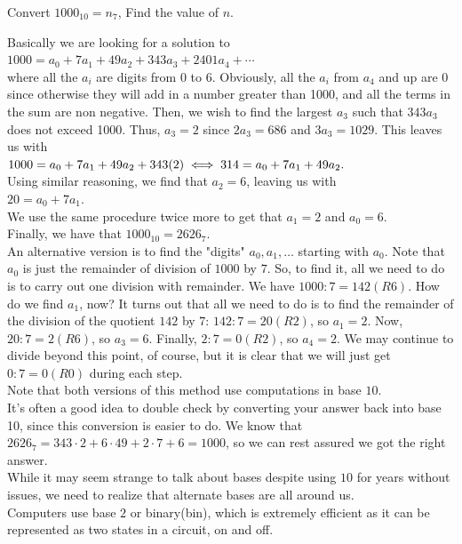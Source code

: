 \begin{example}
    Convert $1000_10=n_7$, Find the value of $n$. 
\end{example}
Basically we are looking for a solution to \\
$1000 = a_0 + 7a_1 + 49a_2 + 343a_3+2401a_4+\cdots$\\
where all the $a_i$ are digits from 0 to 6. Obviously, all the $a_i$ from $a_4$ and up are 0 since otherwise they will add in a number greater than 1000, and all the terms in the sum are non negative. Then, we wish to find the largest $a_3$ such that $343a_3$ does not exceed 1000. Thus, $a_3= 2$ since $2a_3=686$ and $3a_3=1029$. This leaves us with\\
$1000 = a_0 + 7a_1 + 49 a_2 + 343(2)\\
\iff 314 = a_0 + 7a_1 + 49 a_2.$\\
Using similar reasoning, we find that $a_2 = 6$, leaving us with\\
$20 = a_0 + 7a_1.$\\
We use the same procedure twice more to get that $a_1=2$ and $a_0=6$.\\
Finally, we have that $1000_{10}=2626_7$.\\
An alternative version is to find the "digits" $a_0,a_1,\dots$ starting with $a_0$. Note that $a_0$ is just the remainder of division of $1000$ by $7$. So, to find it, all we need to do is to carry out one division with remainder. We have $1000:7=142(R6)$. How do we find $a_1$, now? It turns out that all we need to do is to find the remainder of the division of the quotient $142$ by $7$: $142:7=20(R2)$, so $a_1=2$. Now, $20:7=2(R6)$, so $a_3=6$. Finally, $2:7=0(R2)$, so $a_4=2$. We may continue to divide beyond this point, of course, but it is clear that we will just get $0:7=0(R0)$ during each step.\\
Note that both versions of this method use computations in base $10$.\\
It's often a good idea to double check by converting your answer back into base 10, since this conversion is easier to do. We know that $2626_7=343\cdot 2 + 6\cdot 49 + 2\cdot 7 + 6=1000$, so we can rest assured we got the right answer.\\
While it may seem strange to talk about bases despite using $10$ for years without issues, we need to realize that alternate bases are all around us.\\
Computers use base $2$ or binary(bin), which is extremely efficient as it can be represented as two states in a circuit, on and off.\\
